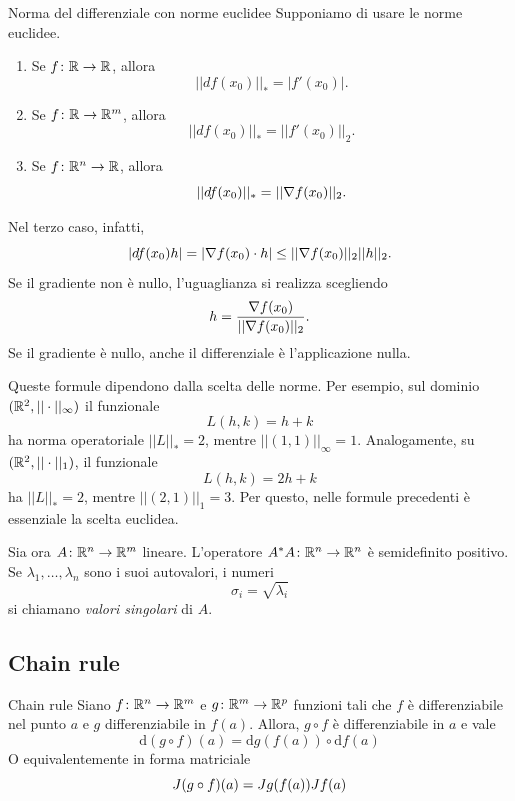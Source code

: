 \documentclass[a4paper]{article}
\begin{document}
\begin{radioactive}
\begin{snippetproposition}{Norma del differenziale con norme euclidee}
    Supponiamo di usare le norme euclidee.
    \begin{enumerate}
        \item Se \(f\colon\mathbb{R}\to\mathbb{R}\), allora
        \[
            ||df(x_0)||_*=|f'(x_0)|.
        \]
        \item Se \(f\colon\mathbb{R}\to\mathbb{R}^m\), allora
        \[
            ||df(x_0)||_*=||f'(x_0)||_2.
        \]
        \item Se \(f\colon\mathbb{R}^n\to\mathbb{R}\), allora
        \[
            ||df(x_0)||_*=||\nabla f(x_0)||_2.
        \]
    \end{enumerate}
\end{snippetproposition}

Nel terzo caso, infatti,
\[
    |df(x_0)h|=|\nabla f(x_0)\cdot h|
    \leq||\nabla f(x_0)||_2||h||_2.
\]
Se il gradiente non è nullo, l'uguaglianza si realizza scegliendo
\[
    h=\frac{\nabla f(x_0)}{||\nabla f(x_0)||_2}.
\]
Se il gradiente è nullo, anche il differenziale è l'applicazione nulla.

Queste formule dipendono dalla scelta delle norme. Per esempio, sul dominio
\((\mathbb{R}^2,||\cdot||_\infty)\) il funzionale
\[
    L(h,k)=h+k
\]
ha norma operatoriale \(||L||_*=2\), mentre \(||(1,1)||_\infty=1\).
Analogamente, su \((\mathbb{R}^2,||\cdot||_1)\), il funzionale
\[
    L(h,k)=2h+k
\]
ha \(||L||_*=2\), mentre \(||(2,1)||_1=3\).
Per questo, nelle formule precedenti è essenziale la scelta euclidea.

Sia ora \(A\colon\mathbb{R}^n\to\mathbb{R}^m\) lineare. L'operatore
\(A^*A\colon\mathbb{R}^n\to\mathbb{R}^n\) è semidefinito positivo.
Se \(\lambda_1,\ldots,\lambda_n\) sono i suoi autovalori, i numeri
\[
    \sigma_i=\sqrt{\lambda_i}
\]
si chiamano \emph{valori singolari} di \(A\).
\end{radioactive}

\subsection{Chain rule}

\begin{radioactive}
\begin{snippettheorem}{Chain rule}
    Siano \(f \colon \mathbb{R}^n \to \mathbb{R}^m\)
    e \(g \colon \mathbb{R}^m \to \mathbb{R}^p\) funzioni
    tali che \(f\) è differenziabile nel punto \(a\) e \(g\)
    differenziabile in \(f(a)\).
    Allora, \(g\circ f\) è differenziabile in \(a\) e vale
    \[
        \text{d}(g\circ f)(a) = \text{d}g(f(a)) \circ \text{d}f(a)
    \]
    O equivalentemente in forma matriciale
    \[
        J(g \circ f)(a) = Jg(f(a)) J f(a)
    \]
\end{snippettheorem}
\end{radioactive}
\end{document}
